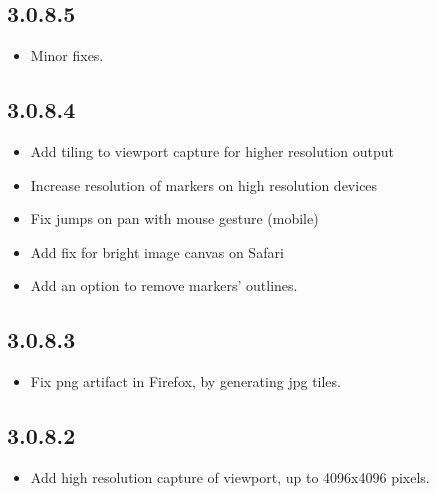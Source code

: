\documentclass[letterpaper,10pt,english,openany,oneside]{sphinxmanual}
\begin{document}
\subsection{3.0.8.5}
\label{\detokenize{docs/intro/versions:id6}}\begin{itemize}
\item {} 
\sphinxAtStartPar
Minor fixes.

\end{itemize}


\subsection{3.0.8.4}
\label{\detokenize{docs/intro/versions:id7}}\begin{itemize}
\item {} 
\sphinxAtStartPar
Add tiling to viewport capture for higher resolution output

\item {} 
\sphinxAtStartPar
Increase resolution of markers on high resolution devices

\item {} 
\sphinxAtStartPar
Fix jumps on pan with mouse gesture (mobile)

\item {} 
\sphinxAtStartPar
Add fix for bright image canvas on Safari

\item {} 
\sphinxAtStartPar
Add an option to remove markers’ outlines.

\end{itemize}


\subsection{3.0.8.3}
\label{\detokenize{docs/intro/versions:id8}}\begin{itemize}
\item {} 
\sphinxAtStartPar
Fix png artifact in Firefox, by generating jpg tiles.

\end{itemize}


\subsection{3.0.8.2}
\label{\detokenize{docs/intro/versions:id9}}\begin{itemize}
\item {} 
\sphinxAtStartPar
Add high resolution capture of viewport, up to 4096x4096 pixels.

\end{itemize}
\end{document}
